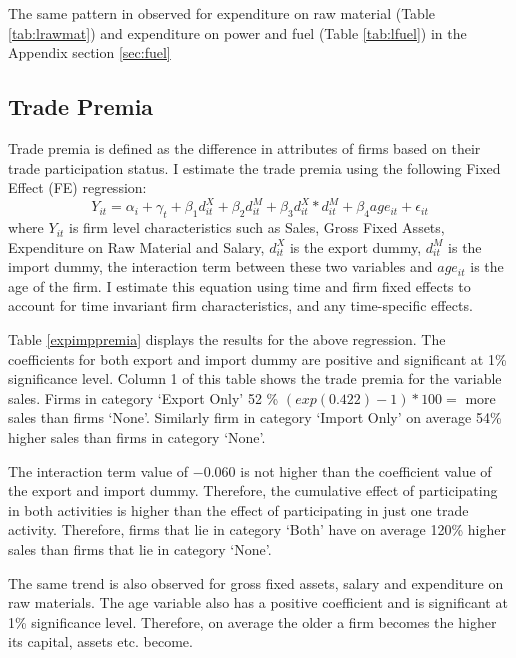 \documentclass[12pt]{article}
\begin{document}
The same pattern in observed for expenditure on raw material (Table \ref{tab:lrawmat}) and
expenditure on power and fuel (Table \ref{tab:lfuel}) in the Appendix
section \ref{sec:fuel}
\subsection{Trade Premia}
Trade premia is defined as the difference in
attributes of firms based on their trade participation status. I
estimate the trade premia using the following Fixed Effect (FE) regression:
\begin{equation}
\label{FE}
 Y_{it} = \alpha_i + \gamma_{t} + \beta_{1} d_{it}^{X}+ \beta_{2} d_{it}^{M}+
\beta_{3} d_{it}^{X}*d_{it}^{M} + \beta_{4} age_{it} + \epsilon_{it}
\end{equation}
where $Y_{it}$ is firm level characteristics such as Sales, Gross
Fixed Assets, Expenditure on Raw Material and Salary, $d_{it}^X$ is
the export dummy, $d_{it}^M$ is
the import  dummy, the interaction term between these two variables
and $age_{it}$ is the age of the firm. I estimate this equation using
time and firm fixed
effects to account for time invariant firm characteristics, and any
time-specific effects.

Table \ref{expimppremia} displays the results for the above
regression. The coefficients for both export and import dummy are positive
and significant at 1\% significance level. Column 1 of this table
shows the trade premia for the variable sales. Firms
in category `Export Only'   52 \% $(exp(0.422) -1)* 100 = $ more
sales than firms `None'. Similarly firm in category `Import Only'
on average 54\% higher sales than firms in category `None'. 

The interaction term value of $-0.060$ is not higher than the coefficient
value of the export and import dummy. Therefore, the cumulative
effect of participating in both activities is higher than the effect
of participating in just one trade activity. Therefore, firms that lie
in category `Both' have  on average 120\% higher sales than firms that
lie in category `None'. 

\begin{center}

\end{center}


 
 The same trend
is also observed for  gross fixed assets, salary and expenditure on
raw materials.  The age variable also
has a positive coefficient and is significant at 1\% significance
level. Therefore,  on average the older a firm becomes the higher its capital,
assets etc. become. 
\end{document}
